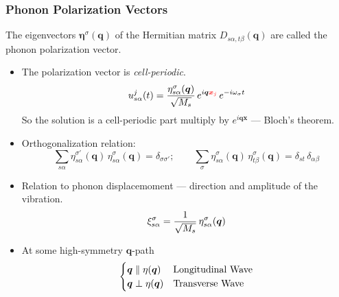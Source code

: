 \begin{frame}
  \frametitle{Phonon Polarization Vectors}

  The eigenvectors $\boldsymbol{\eta}^\sigma(\boldsymbol{q})$ of the Hermitian
  matrix $D_{s\alpha,t\beta}(\boldsymbol{q})$ are called the phonon polarization
  vector.

  \begin{itemize}
    \setlength\itemsep{\smallskipamount}
    
    \item The polarization vector is \emph{cell-periodic}.
    \begin{equation*}
        {u}_{s\alpha}^j(t) =
        {{\eta}^\sigma_{s\alpha}(\boldsymbol{q}) \over \sqrt{M_s}}\,
        e^{i\boldsymbol{q}\mathcolor{red}{\boldsymbol{x}_j}} \,e^{- i\omega_\sigma t}
    \end{equation*}
    So the solution is a cell-periodic part multiply by
    $e^{i\boldsymbol{q}\boldsymbol{x}}$ --- Bloch's theorem.

    \item Orthogonalization relation:
    \begin{equation*}
      \sum_{s\alpha}
      \eta^{\sigma'}_{s\alpha}(\boldsymbol{q})\,
      \eta^{\sigma}_{s\alpha}(\boldsymbol{q})
      = \delta_{\sigma\sigma'};
      \qquad
      \sum_{\sigma}
      \eta^{\sigma}_{s\alpha}(\boldsymbol{q})\,
      \eta^{\sigma}_{t\beta}(\boldsymbol{q})
      = \delta_{st} \, \delta_{\alpha\beta}
    \end{equation*}
    \item Relation to phonon displacemoment --- direction and amplitude of the vibration.
      \begin{equation*}
      \xi^{\sigma}_{s\alpha} = {1\over\sqrt{M_s}}\,\eta^{\sigma}_{s\alpha}(\boldsymbol{q})
      \end{equation*}
      
    \item At some high-symmetry $\boldsymbol{q}$-path
      \begin{equation*}
        \begin{cases}
          \boldsymbol{q} \parallel \mathbf{\eta}(\boldsymbol{q}) & \text{Longitudinal Wave} \cr
          \boldsymbol{q} \perp     \mathbf{\eta}(\boldsymbol{q}) & \text{Transverse Wave} \cr
        \end{cases}
      \end{equation*}
  \end{itemize}
\end{frame}

